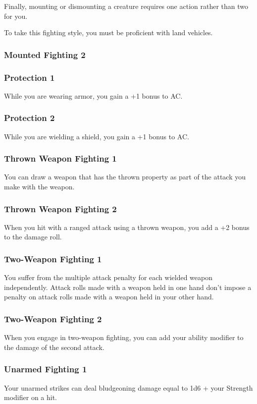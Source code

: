     Finally, mounting or dismounting a creature requires one action rather than two for you.

    To take this fighting style, you must be proficient with land vehicles.
\subsubsection{Mounted Fighting 2}

\subsubsection{Protection 1}
    While you are wearing armor, you gain a +1 bonus to AC.
\subsubsection{Protection 2}
    While you are wielding a shield, you gain a +1 bonus to AC.
\subsubsection{Thrown Weapon Fighting 1}
    You can draw a weapon that has the thrown property as part of the attack you make with the weapon.
\subsubsection{Thrown Weapon Fighting 2}
    When you hit with a ranged attack using a thrown weapon, you add a +2 bonus to the damage roll.
\subsubsection{Two-Weapon Fighting 1}
    You suffer from the multiple attack penalty for each wielded weapon independently.
    Attack rolls made with a weapon held in one hand don't impose a penalty on attack rolls made with a weapon held in your other hand.
\subsubsection{Two-Weapon Fighting 2}
    When you engage in two-weapon fighting, you can add your ability modifier to the damage of the second attack.
\subsubsection{Unarmed Fighting 1}
    Your unarmed strikes can deal bludgeoning damage equal to 1d6 + your Strength modifier on a hit.

